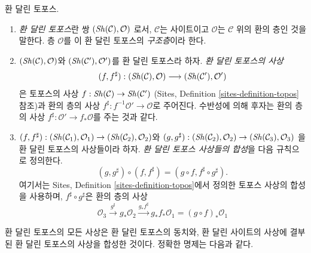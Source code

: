 \begin{definition}
\label{definition-ringed-topos}
환 달린 토포스.
\begin{enumerate}
\item {\it 환 달린 토포스}란 쌍
$(\mathop{\mathit{Sh}}\nolimits(\mathcal{C}), \mathcal{O})$
로서, $\mathcal{C}$는 사이트이고 $\mathcal{O}$는 $\mathcal{C}$ 위의 환의
층인 것을 말한다. 층 $\mathcal{O}$를 이 환 달린 토포스의 {\it 구조층}이라 한다.
\item $(\mathop{\mathit{Sh}}\nolimits(\mathcal{C}), \mathcal{O})$와
$(\mathop{\mathit{Sh}}\nolimits(\mathcal{C}'), \mathcal{O}')$를 환 달린 토포스라 하자.
{\it 환 달린 토포스의 사상}
$$
(f, f^\sharp) :
(\mathop{\mathit{Sh}}\nolimits(\mathcal{C}), \mathcal{O})
\longrightarrow
(\mathop{\mathit{Sh}}\nolimits(\mathcal{C}'), \mathcal{O}')
$$
은 토포스의 사상 $f : \mathop{\mathit{Sh}}\nolimits(\mathcal{C}) \to \mathop{\mathit{Sh}}\nolimits(\mathcal{C}')$
(Sites, Definition \ref{sites-definition-topos} 참조)과 환의 층의 사상
$f^\sharp : f^{-1}\mathcal{O}' \to \mathcal{O}$로 주어진다. 수반성에 의해
후자는 환의 층의 사상 $f^\sharp : \mathcal{O}' \to f_*\mathcal{O}$를
주는 것과 같다.
\item
$(f, f^\sharp) :
(\mathop{\mathit{Sh}}\nolimits(\mathcal{C}_1), \mathcal{O}_1)
\to (\mathop{\mathit{Sh}}\nolimits(\mathcal{C}_2), \mathcal{O}_2)$와
$(g, g^\sharp) :
(\mathop{\mathit{Sh}}\nolimits(\mathcal{C}_2), \mathcal{O}_2) \to
(\mathop{\mathit{Sh}}\nolimits(\mathcal{C}_3), \mathcal{O}_3)$
을 환 달린 토포스의 사상들이라 하자. {\it 환 달린 토포스 사상들의 합성}을
다음 규칙으로 정의한다.
$$
(g, g^\sharp) \circ (f, f^\sharp) = (g \circ f, f^\sharp \circ g^\sharp).
$$
여기서는 Sites, Definition \ref{sites-definition-topos}에서 정의한 토포스
사상의 합성을 사용하며, $f^\sharp \circ g^\sharp$은 환의 층의 사상
$$
\mathcal{O}_3 \xrightarrow{g^\sharp} g_*\mathcal{O}_2
\xrightarrow{g_*f^\sharp} g_*f_*\mathcal{O}_1 = (g \circ f)_*\mathcal{O}_1
$$
\end{enumerate}
\end{definition}

\noindent
환 달린 토포스의 모든 사상은 환 달린 토포스의 동치와, 환 달린 사이트의
사상에 결부된 환 달린 토포스의 사상을 합성한 것이다. 정확한 명제는 다음과 같다.

